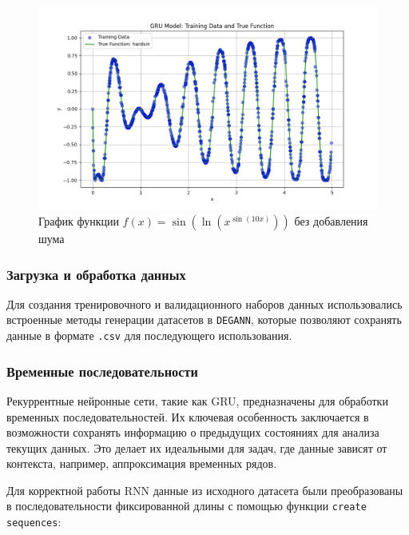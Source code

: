 \begin{figure}[H]
    \begin{columns}
    \begin{column}{\textwidth}
        \centering
        \includegraphics[width=1\textwidth]{figures/hardsin_train_data_without_noise.png}
        \caption{График функции $f(x) = \sin\left(\ln(x^{\sin(10x)})\right)$ без добавления шума}
        \label{fig:hardsin_graph}
        \vspace{0.3cm}
    \end{column}
    \end{columns}
\end{figure}


\subsubsection{Загрузка и обработка данных}
Для создания тренировочного и валидационного наборов данных использовались встроенные методы генерации датасетов в \texttt{DEGANN}, которые позволяют сохранять данные в формате \texttt{.csv} для последующего использования.


\subsubsection{Временные последовательности}
Рекуррентные нейронные сети, такие как GRU, предназначены для обработки временных последовательностей. Их ключевая особенность заключается в возможности сохранять информацию о предыдущих состояниях для анализа текущих данных. Это делает их идеальными для задач, где данные зависят от контекста, например, аппроксимация временных рядов.

Для корректной работы RNN данные из исходного датасета были преобразованы в последовательности фиксированной длины с помощью функции \texttt{create sequences}:

